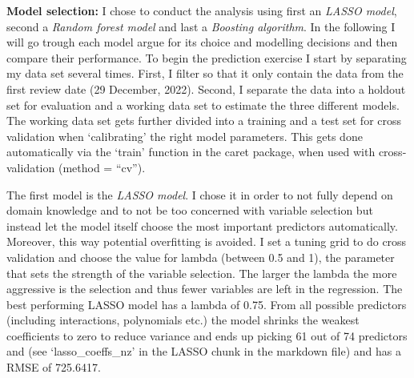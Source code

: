 \documentclass[
]{article}
\begin{document}
\textbf{Model selection:} I chose to conduct the analysis using first an
\emph{LASSO model}, second a \emph{Random forest model} and last a
\emph{Boosting algorithm}. In the following I will go trough each model
argue for its choice and modelling decisions and then compare their
performance. To begin the prediction exercise I start by separating my
data set several times. First, I filter so that it only contain the data
from the first review date (29 December, 2022). Second, I separate the
data into a holdout set for evaluation and a working data set to
estimate the three different models. The working data set gets further
divided into a training and a test set for cross validation when
`calibrating' the right model parameters. This gets done automatically
via the `train' function in the caret package, when used with
cross-validation (method = ``cv'').

The first model is the \emph{LASSO model}. I chose it in order to not
fully depend on domain knowledge and to not be too concerned with
variable selection but instead let the model itself choose the most
important predictors automatically. Moreover, this way potential
overfitting is avoided. I set a tuning grid to do cross validation and
choose the value for lambda (between 0.5 and 1), the parameter that sets
the strength of the variable selection. The larger the lambda the more
aggressive is the selection and thus fewer variables are left in the
regression. The best performing LASSO model has a lambda of 0.75. From
all possible predictors (including interactions, polynomials etc.) the
model shrinks the weakest coefficients to zero to reduce variance and
ends up picking 61 out of 74 predictors and (see `lasso\_coeffs\_nz' in
the LASSO chunk in the markdown file) and has a RMSE of 725.6417.
\end{document}
